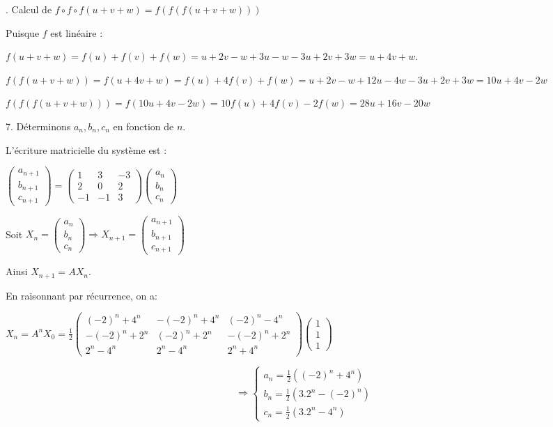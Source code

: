 \documentclass[12pt]{article}
\begin{document}
\begin{spacing}{1.5}
. Calcul de $f\circ f\circ f(u+v+w)=f(f(f(u+v+w)))$

Puisque $f$ est linéaire :

$f(u+v+w)=f(u)+f(v)+f(w)=u+2v-w+3u-w-3u+2v+3w=u+4v+w$.

$f(f(u+v+w))=f(u+4v+w)=f(u)+4f(v)+f(w)=u+2v-w+12u-4w-3u+2v+3w=10u+4v-2w$

$f(f(f(u+v+w)))=f(10u+4v-2w)=10f(u)+4f(v)-2f(w)=28u+16v-20w$

7. Déterminons $a_n,b_n,c_n$ en fonction de $n$.

L'écriture matricielle du système est :


$\begin{pmatrix}
a_{n+1}\\
b_{n+1}\\
c_{n+1}
\end{pmatrix}=\begin{pmatrix}
1 & 3 & -3 \\ 
2 & 0 & 2 \\ 
-1 & -1 & 3
\end{pmatrix}\begin{pmatrix}
a_{n}\\
b_{n}\\
c_{n}
\end{pmatrix}$

Soit $X_n=\begin{pmatrix}
a_{n}\\
b_{n}\\
c_{n}
\end{pmatrix}\Rightarrow X_{n+1}=\begin{pmatrix}
a_{n+1}\\
b_{n+1}\\
c_{n+1}
\end{pmatrix}$

Ainsi $X_{n+1}=AX_n$.

En raisonnant par récurrence, on a: 

$X_n=A^nX_0=\frac{1}{2}\begin{pmatrix}
(-2)^n+4^n & -(-2)^n+4^n & (-2)^n-4^n \\ 
-(-2)^n+2^n & (-2)^n+2^n & -(-2)^n+2^n \\ 
2^n-4^n & 2^n-4^n & 2^n+4^n
\end{pmatrix}\begin{pmatrix}
1\\
1\\
1
\end{pmatrix}$

\[
\Rightarrow \begin{cases}
a_n=\frac{1}{2}((-2)^n+4^n)\\
b_n=\frac{1}{2}(3.2^n-(-2)^n)\\
c_n=\frac{1}{2}(3.2^n-4^n)
\end{cases}
\]



\end{spacing}
\end{document}
